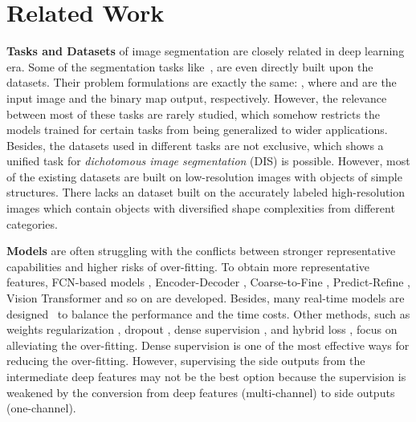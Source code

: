 \documentclass[10pt,twocolumn,letterpaper]{article}
\begin{document}
\section{Related Work}\label{sec:RelatedWork}
\noindent\textbf{Tasks and Datasets} of image segmentation are closely related in deep learning era. Some of the segmentation tasks like~\cite{DBLP:journals/pami/ChengMHTH15,wang2017learning,fan2021concealed,liew2021deep,yang2020meticulous,shen2016automatic,DBLP:journals/corr/abs-2108-11515,MnihThesis}, are even directly built upon the datasets. Their problem formulations are exactly the same: , where  and  are the input image and the binary map output, respectively. 
However, the relevance between most of these tasks are rarely studied, which somehow restricts the models trained for certain tasks from being generalized to wider applications. Besides, the datasets used in different tasks are not exclusive, 
which shows a unified task for \textit{dichotomous image segmentation} (DIS) is possible. 
However, most of the existing datasets are built on low-resolution images with objects of simple structures. There lacks an dataset built on the accurately labeled high-resolution images which contain objects with diversified shape complexities from different categories. 

\noindent\textbf{Models} are often struggling with the conflicts between stronger representative capabilities and higher risks of over-fitting. To obtain more representative features, FCN-based models \cite{long2015fully}, Encoder-Decoder \cite{badrinarayanan2017segnet,ronneberger2015u}, Coarse-to-Fine \cite{wang2018detect}, Predict-Refine \cite{qin2019basnet,HRRN_ICCV2021}, Vision Transformer \cite{zheng2020rethinking} and so on are developed. Besides, many real-time models are designed~\cite{zhao2018icnet,yu2018bisenet,li2019dfanet,orsic2019defense,hu2020temporally,Fan_2021_CVPR,nirkin2020hyperseg} to balance the performance and the time costs. 
Other methods, such as weights regularization \cite{Goodfellow-et-al-2016}, dropout \cite{DBLP:journals/jmlr/SrivastavaHKSS14}, dense supervision \cite{lee2015deeply,qin2020u2,xie2015holistically}, and hybrid loss \cite{luc2016semantic,qin2019basnet,zhao2019egnet}, focus on alleviating the over-fitting. Dense supervision is one of the most effective ways for reducing the over-fitting. However, supervising the side outputs from the intermediate deep features may not be the best option because the supervision is weakened by the conversion from deep features (multi-channel) to side outputs (one-channel). 
\end{document}
